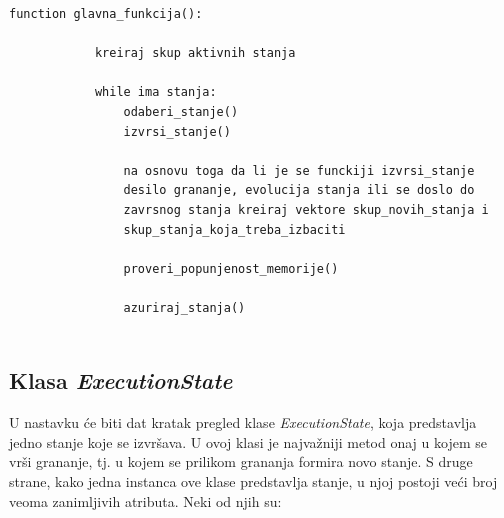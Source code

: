 \documentclass[12pt,oneside]{memoir}
\begin{document}
    \begin{lstlisting}[caption={Pseudokod glavne funckije algoritma},captionpos=b,label={lst:glavna}]
        function glavna_funkcija():
        
            kreiraj skup aktivnih stanja
            
            while ima stanja:
                odaberi_stanje()
                izvrsi_stanje()
                
                na osnovu toga da li je se funckiji izvrsi_stanje 
                desilo grananje, evolucija stanja ili se doslo do 
                zavrsnog stanja kreiraj vektore skup_novih_stanja i 
                skup_stanja_koja_treba_izbaciti
                
                proveri_popunjenost_memorije()

                azuriraj_stanja()
            
    \end{lstlisting}

\subsection{Klasa \textit{ExecutionState}}
U nastavku će biti dat kratak pregled klase \textit{ExecutionState}, koja predstavlja jedno stanje koje se izvršava. U ovoj klasi je najvažniji metod onaj u kojem se vrši grananje, tj. u kojem se prilikom grananja formira novo stanje. S druge strane, kako jedna instanca ove klase predstavlja stanje, u njoj postoji veći broj veoma zanimljivih atributa. Neki od njih su:
\end{document}
